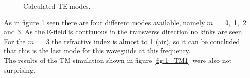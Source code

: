 \begin{figure}[h]
\caption{Calculated TE modes.}%
\label{fig:1_TE}%
\end{figure}

\newpage
As in figure \ref{fig:1_TE} seen there are four different modes available, namely $m$~=~0,~1,~2 and 3. As the E-field is continuous in the transverse direction no kinks are seen.  For the $m~=~3$ the refractive index is almost to 1 (air), so it can be concluded that this is the last mode for this waveguide at this frequency.\\
The results of the TM simulation shown in figure \ref{fig:1_TM1} were also not surprising.

